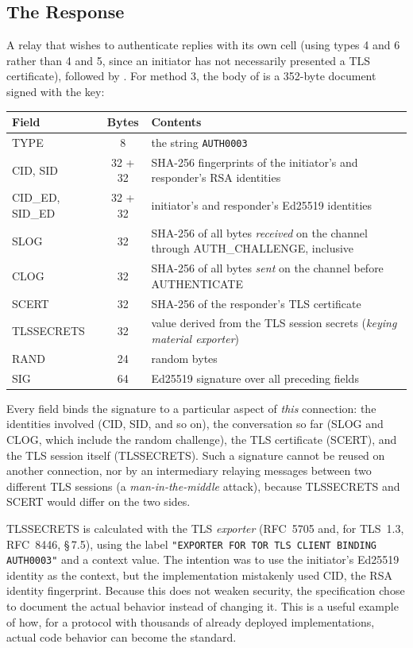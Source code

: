 \subsection{The Response}

A relay that wishes to authenticate replies with its own  cell (using types 4 and 6 rather than 4 and 5, since an initiator has not necessarily presented a TLS certificate), followed by . For method 3, the body of  is a 352-byte document signed with the  key:

\begin{center}\small
\begin{tabularx}{\textwidth}{@{}l c >{\raggedright\arraybackslash}X@{}}
\toprule
Field & Bytes & Contents \\
\midrule
TYPE & 8 & the string \texttt{AUTH0003} \\
CID, SID & 32 + 32 & SHA-256 fingerprints of the initiator's and responder's RSA identities \\
CID\_ED, SID\_ED & 32 + 32 & initiator's and responder's Ed25519 identities \\
SLOG & 32 & SHA-256 of all bytes \emph{received} on the channel through AUTH\_CHALLENGE, inclusive \\
CLOG & 32 & SHA-256 of all bytes \emph{sent} on the channel before AUTHENTICATE \\
SCERT & 32 & SHA-256 of the responder's TLS certificate \\
TLSSECRETS & 32 & value derived from the TLS session secrets (\emph{keying material exporter}) \\
RAND & 24 & random bytes \\
SIG & 64 & Ed25519 signature over all preceding fields \\
\bottomrule
\end{tabularx}
\end{center}

Every field binds the signature to a particular aspect of \emph{this} connection: the identities involved (CID, SID, and so on), the conversation so far (SLOG and CLOG, which include the random challenge), the TLS certificate (SCERT), and the TLS session itself (TLSSECRETS). Such a signature cannot be reused on another connection, nor by an intermediary relaying messages between two different TLS sessions (a \emph{man-in-the-middle} attack), because TLSSECRETS and SCERT would differ on the two sides.

\begin{approfondimento}
TLSSECRETS is calculated with the TLS \emph{exporter} (RFC~5705 and, for TLS~1.3, RFC~8446, §\,7.5), using the label \texttt{"EXPORTER FOR TOR TLS CLIENT BINDING AUTH0003"} and a context value. The intention was to use the initiator's Ed25519 identity as the context, but the implementation mistakenly used CID, the RSA identity fingerprint. Because this does not weaken security, the specification chose to document the actual behavior instead of changing it. This is a useful example of how, for a protocol with thousands of already deployed implementations, actual code behavior can become the standard.
\end{approfondimento}

